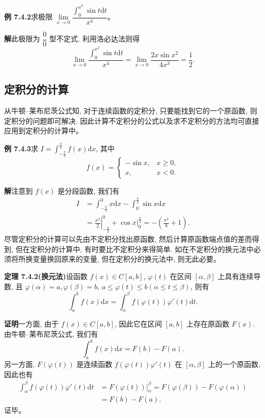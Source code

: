 \documentclass[UTF8, 12pt, fontset=fandol, oneside]{ctexart}
\begin{document}
\noindent\textbf{例 7.4.2}\quad 求极限 $\lim\limits_{x\to0}\dfrac{\int_0^{x^2}\sin t\mathrm dt}{x^4}$。

\noindent\textbf{解}\quad 此极限为 $\dfrac{0}{0}$ 型不定式. 利用洛必达法则得
\[
  \lim_{x\to0}\frac{\int_0^{x^2}\sin t\mathrm dt}{x^4}
  =\lim_{x\to0}\frac{2x\sin x^2}{4x^3}=\frac{1}{2}.
\]

\subsection{定积分的计算}

从牛顿--莱布尼茨公式知, 对于连续函数的定积分, 只要能找到它的一个原函数, 则定积分的问题即可解决. 因此计算不定积分的公式以及求不定积分的方法均可直接应用到定积分的计算中。

\noindent\textbf{例 7.4.3}\quad 求 $I=\int_{-\frac{\pi}{2}}^{\frac{\pi}{2}} f(x)\mathrm dx$, 其中
\[
  f(x)=
  \begin{cases}
    -\sin x, & x\geq0,\\
    x, & x<0.
  \end{cases}
\]

\noindent\textbf{解}\quad 注意到 $f(x)$ 是分段函数, 我们有
\[
\begin{aligned}
  I&=\int_{-\frac{\pi}{2}}^0 x\mathrm dx-\int_0^{\frac{\pi}{2}}\sin x\mathrm dx\\
  &=\left.\frac{x^2}{2}\right|_{-\frac{\pi}{2}}^0+\left.\cos x\right|_0^{\frac{\pi}{2}}
  =-\left(\frac{\pi^2}{8}+1\right).
\end{aligned}
\]
尽管定积分的计算可以先由不定积分找出原函数, 然后计算原函数端点值的差而得到, 但在定积分的计算中, 有时要比不定积分来得简单. 如在不定积分的换元法中必须将所换变量换回原来的变量, 但在定积分的换元法中, 则无此必要。

\noindent\textbf{定理 7.4.2(换元法)}\quad 设函数 $f(x)\in C[a,b]$, $\varphi(t)$ 在区间 $[\alpha,\beta]$ 上具有连续导数, 且 $\varphi(\alpha)=a,\varphi(\beta)=b$, $a\leq\varphi(t)\leq b(\alpha\leq t\leq\beta)$, 则有
\[
  \int_a^b f(x)\mathrm dx=\int_\alpha^\beta f(\varphi(t))\varphi'(t)\mathrm dt.
\]

\noindent\textbf{证明}\quad 一方面, 由于 $f(x)\in C[a,b]$, 因此它在区间 $[a,b]$ 上存在原函数 $F(x)$. 由牛顿--莱布尼茨公式, 我们有
\[
  \int_a^b f(x)\mathrm dx=F(b)-F(a).
\]
另一方面, $F(\varphi(t))$ 是连续函数 $f(\varphi(t))\varphi'(t)$ 在 $[\alpha,\beta]$ 上的一个原函数, 因此也有
\[
\begin{aligned}
  \int_\alpha^\beta f(\varphi(t))\varphi'(t)\mathrm dt
  &=\left.F(\varphi(t))\right|_\alpha^\beta
  =F(\varphi(\beta))-F(\varphi(\alpha))\\
  &=F(b)-F(a).
\end{aligned}
\]
证毕。
\end{document}
